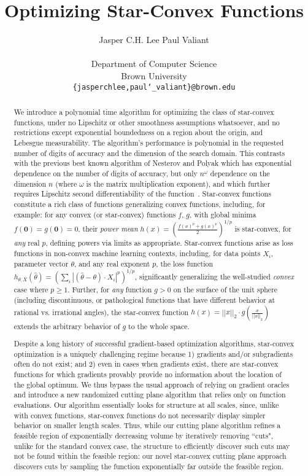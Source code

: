 \documentclass[11pt,letter]{article}
\title{Optimizing Star-Convex Functions}
\author{
Jasper C.H. Lee
\quad
Paul Valiant\\ \ \\
Department of Computer Science\\
Brown University\\
\texttt{\{jasperchlee,paul\char`_valiant\}@brown.edu}
}
\renewcommand{\vec}[1]{\mathbf{#1}}
\numberwithin{nTheorems}{section}
\begin{document}
\maketitle
\begin{abstract}
We introduce a polynomial time algorithm for optimizing the class of star-convex functions, under no Lipschitz or other smoothness assumptions whatsoever, and no restrictions except exponential boundedness on a region about the origin, and Lebesgue measurability. The algorithm's performance is polynomial in the requested number of digits of accuracy and the dimension of the search domain. This contrasts with the previous best known algorithm of Nesterov and Polyak which has exponential dependence on the number of digits of accuracy, but only $n^\omega$ dependence on the dimension $n$ (where $\omega$ is the matrix multiplication exponent), and which further requires Lipschitz second differentiability of the function~\cite{Nesterov:2006}. Star-convex functions constitute a rich class of functions generalizing convex functions, including, for example: for any convex (or star-convex) functions $f$, $g$, with global minima $f(\vec{0})=g(\vec{0})=0$, their \emph{power mean} $h(x)=\left(\frac{f(x)^p+g(x)^p}{2}\right)^{1/p}$ is star-convex, for \emph{any} real $p$, defining powers via limits as appropriate. Star-convex functions arise as loss functions in non-convex machine learning contexts, including, for data points $X_i$, parameter vector $\theta$, and any real exponent $p$, the loss function $h_{\theta,X}(\hat{\theta})=\left(\sum_i |(\hat{\theta}-\theta)\cdot X_i|^p\right)^{1/p}$, significantly generalizing the well-studied \emph{convex} case where $p\geq 1$. Further, for \emph{any} function $g>0$ on the surface of the unit sphere (including discontinuous, or pathological functions that have different behavior at rational vs. irrational angles), the star-convex function $h(x)=||x||_2\cdot g\left(\frac{x}{||x||_2}\right)$ extends the arbitrary behavior of $g$ to the whole space.

Despite a long history of successful gradient-based optimization algorithms, star-convex optimization is a uniquely challenging regime because 1) gradients and/or subgradients often do not exist; and 2) even in cases when gradients exist, there are star-convex functions for which gradients provably provide no information about the location of the global optimum. We thus bypass the usual approach of relying on gradient oracles and introduce a new randomized cutting plane algorithm that relies only on function evaluations. Our algorithm essentially looks for structure at all scales, since, unlike with convex functions, star-convex functions do not necessarily display simpler behavior on smaller length scales. Thus, while our cutting plane algorithm refines a feasible region of exponentially decreasing volume by iteratively removing ``cuts", unlike for the standard convex case, the structure to efficiently discover such cuts may not be found within the feasible region: our novel star-convex cutting plane approach discovers cuts by sampling the function exponentially far outside the feasible region.


\end{abstract}
\end{document}
